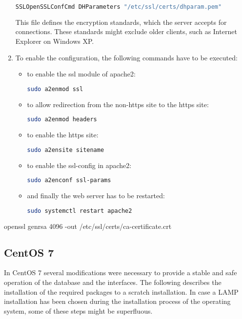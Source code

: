 \begin{enumerate}
\begin{lstlisting}[language=bash]
   SSLOpenSSLConfCmd DHParameters "/etc/ssl/certs/dhparam.pem"
  \end{lstlisting}
  This file defines the encryption standards, which the server accepts for connections. These standards might exclude older clients, such as Internet Explorer on Windows XP.
  \item To enable the configuration, the following commands have to be executed:
  \begin{itemize}
  \item to enable the ssl module of apache2:
  \begin{lstlisting}[language=bash]
   sudo a2enmod ssl
  \end{lstlisting}
  \item to allow redirection from the non-https site to the https site:
  \begin{lstlisting}[language=bash]
   sudo a2enmod headers
  \end{lstlisting}
  \item to enable the https site:
  \begin{lstlisting}[language=bash]
   sudo a2ensite sitename
  \end{lstlisting}
  \item to enable the ssl-config in apache2:
  \begin{lstlisting}[language=bash]
   sudo a2enconf ssl-params
  \end{lstlisting}
  \item and finally the web server has to be restarted:
  \begin{lstlisting}[language=bash]
   sudo systemctl restart apache2
  \end{lstlisting}
  \end{itemize}
  
\end{enumerate}





openssl genrsa 4096 -out /etc/ssl/certs/ca-certificate.crt


\subsection{CentOS 7}
In CentOS 7 several modifications were necessary to provide a stable and safe operation of the database and the interfaces. The following describes the installation of the required
packages to a scratch installation. In case a LAMP installation has been chosen during the installation process of the operating system, some of these steps might be superfluous. 

